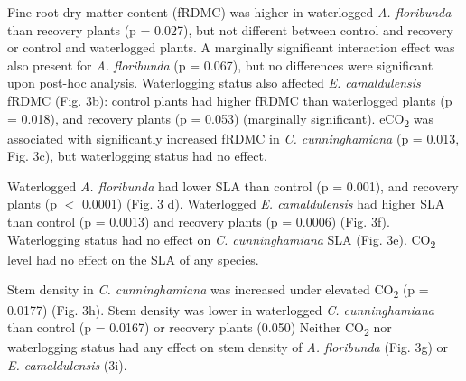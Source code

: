 \documentclass[12pt,a4paper]{memoir}
\begin{document}
Fine root dry matter content (fRDMC) was higher in waterlogged \textit{A. floribunda} than recovery plants (p = 0.027), but not different between control and recovery or control and waterlogged plants. A marginally significant interaction effect was also present for \textit{A. floribunda} (p = 0.067), but no differences were significant upon post-hoc analysis. Waterlogging status also affected \textit{E. camaldulensis} fRDMC (Fig. 3b): control plants had higher fRDMC than waterlogged plants (p = 0.018), and recovery plants (p = 0.053) (marginally significant). eCO\textsubscript{2} was associated with significantly increased fRDMC in \textit{C. cunninghamiana} (p = 0.013, Fig. 3c), but waterlogging status had no effect.

Waterlogged \textit{A. floribunda} had lower SLA than control (p = 0.001), and recovery plants (p $<$ 0.0001) (Fig. 3 d). Waterlogged \textit{E. camaldulensis} had higher SLA than control (p = 0.0013) and recovery plants (p = 0.0006) (Fig. 3f). Waterlogging status had no effect on \textit{C. cunninghamiana} SLA (Fig. 3e). CO\textsubscript{2} level had no effect on the SLA of any species. 

Stem density in \textit{C. cunninghamiana} was increased under elevated CO\textsubscript{2} (p = 0.0177) (Fig. 3h). Stem density was lower in waterlogged \textit{C. cunninghamiana} than control (p = 0.0167) or recovery plants (0.050) Neither CO\textsubscript{2} nor waterlogging status had any effect on stem density of \textit{A. floribunda} (Fig. 3g) or \textit{E. camaldulensis} (3i).
\end{document}
